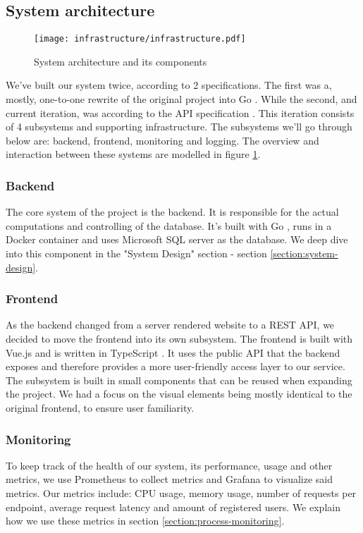 \subsection{System architecture}
\begin{figure}[h]
    \centering
    \texttt{[image: infrastructure/infrastructure.pdf]}
    \caption{System architecture and its components}
    \label{fig:architecture}
\end{figure}

We've built our system twice, according to 2 specifications. The first was a, mostly, one-to-one rewrite of the original project into Go \cite{tool:go}.
While the second, and current iteration, was according to the API specification \cite{spec:api}. 
This iteration consists of 4 subsystems and supporting infrastructure. The subsystems we'll go through below are: backend, frontend, monitoring and logging.
The overview and interaction between these systems are modelled in figure \ref{fig:architecture}.

\subsubsection{Backend}
The core system of the project is the backend. It is responsible for the actual computations and controlling of the database.
It's built with Go \cite{tool:go}, runs in a Docker container and uses Microsoft SQL server \cite{tool:microsoft-sql-server} as the database. We deep dive into this component in the "System Design" section - section \ref{section:system-design}.

\subsubsection{Frontend}
As the backend changed from a server rendered website to a REST API, we decided to move the frontend into its own subsystem.
The frontend is built with Vue.js \cite{tool:vue} and is written in TypeScript \cite{tool:typescript}.
It uses the public API that the backend exposes and therefore provides a more user-friendly access layer to our service.
The subsystem is built in small components that can be reused when expanding the project. We had a focus on the visual elements being mostly identical to the original frontend, to ensure user familiarity.

\subsubsection{Monitoring}
To keep track of the health of our system, its performance, usage and other metrics, we use Prometheus \cite{tool:prometheus} to collect metrics and Grafana \cite{tool:grafana} to visualize said metrics.
Our metrics include: CPU usage, memory usage, number of requests per endpoint, average request latency and amount of registered users.
We explain how we use these metrics in section \ref{section:process-monitoring}.

